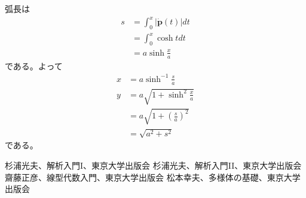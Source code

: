 \documentclass[a4j,disablejfam,dvipdfmx,papersize,slide,uplatex,21pt]{jsarticle}
\makeatletter
\renewenvironment{proof}[1][\proofname]{\par
        \pushQED{\qed}
        \normalfont
        \topsep6\p@\@plus6\p@ \trivlist
        \item[\hskip\labelsep{\bfseries #1}\@addpunct{\bfseries}]\ignorespaces
    }{%
        \popQED\endtrivlist\@endpefalse
    }
\renewcommand{\proofname}{証明.}
\makeatother
\begin{document}
\newpage
\begin{proof}
    弧長は
    \begin{alignat}{1}
        s &= \int_0^x |\dot{\bm{p}}(t)| dt \\
            &= \int_0^x \cosh t dt \\
            &= a \sinh \frac{x}{a}
    \end{alignat}
    である。よって
    \begin{alignat}{1}
        x &= a \sinh^{-1} \frac{s}{a} \\
        y &= a \sqrt{1 + \sinh^2 \frac{x}{a}} \\
            &= a \sqrt{1 + \left(\frac{s}{a}\right)^2} \\
            &= \sqrt{a^2 + s^2}
    \end{alignat}
    である。
\end{proof}




\begin{thebibliography}{99}
     杉浦光夫、解析入門I、東京大学出版会
     杉浦光夫、解析入門II、東京大学出版会
     齋藤正彦、線型代数入門、東京大学出版会
     松本幸夫、多様体の基礎、東京大学出版会
\end{thebibliography}
\end{document}

